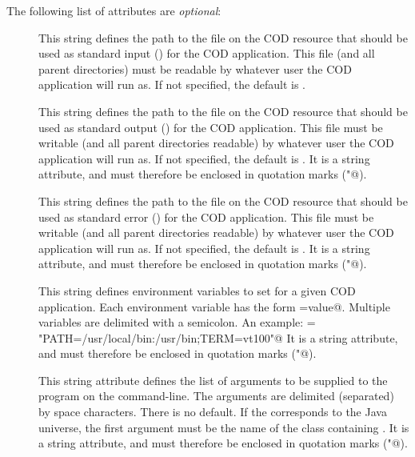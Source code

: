 
The following list of attributes are \emph{optional}:

\begin{description}

 \item[] This string defines the path to the file on the
   COD resource that should be used as standard input () for 
   the COD application.
   This file (and all parent directories) must be readable by whatever
   user the COD application will run as.
   If not specified, the default is .
 
 \item[] This string defines the path to the file on the
   COD resource that should be used as standard output ()
   for the COD application.
   This file must be writable (and all parent directories readable) by
   whatever user the COD application will run as.
   If not specified, the default is .
   It is a string attribute, and must therefore be enclosed in 
   quotation marks (\verb@"@).
 
 \item[] This string defines the path to the file on the
   COD resource that should be used as standard error ()
   for the COD application.
   This file must be writable (and all parent directories readable) by
   whatever user the COD application will run as.
   If not specified, the default is .
   It is a string attribute, and must therefore be enclosed in 
   quotation marks (\verb@"@).

 \item[] This string defines environment variables to
   set for a given COD application.
   Each environment variable has the form \verb@NAME=value@.
   Multiple variables are delimited with a semicolon.
   An example: \verb@Env = "PATH=/usr/local/bin:/usr/bin;TERM=vt100"@ 
   It is a string attribute, and must therefore be enclosed in 
   quotation marks (\verb@"@).

 \item[] This string attribute defines the list of
   arguments to be supplied to the program on the command-line.
   The arguments are delimited (separated) by space characters. 
   There is no default. 
   If the  corresponds to the Java
   universe, the first argument must be the name of the class
   containing .
   It is a string attribute, and must therefore be enclosed in 
   quotation marks (\verb@"@).


\end{description}
